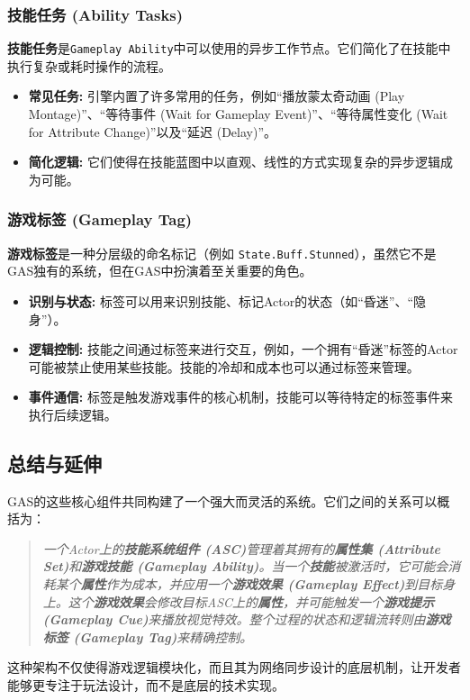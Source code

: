 \documentclass[10pt,CJKmath]{zhbook-v1}
\begin{document}
\subsubsection{技能任务 (Ability Tasks)}
\textbf{技能任务}是\texttt{Gameplay Ability}中可以使用的异步工作节点。它们简化了在技能中执行复杂或耗时操作的流程。
\begin{itemize}
    \item \textbf{常见任务:} 引擎内置了许多常用的任务，例如“播放蒙太奇动画 (Play Montage)”、“等待事件 (Wait for Gameplay Event)”、“等待属性变化 (Wait for Attribute Change)”以及“延迟 (Delay)”。
    \item \textbf{简化逻辑:} 它们使得在技能蓝图中以直观、线性的方式实现复杂的异步逻辑成为可能。
\end{itemize}

\subsubsection{游戏标签 (Gameplay Tag)}
\textbf{游戏标签}是一种分层级的命名标记（例如 \texttt{State.Buff.Stunned}），虽然它不是GAS独有的系统，但在GAS中扮演着至关重要的角色。
\begin{itemize}
    \item \textbf{识别与状态:} 标签可以用来识别技能、标记Actor的状态（如“昏迷”、“隐身”）。
    \item \textbf{逻辑控制:} 技能之间通过标签来进行交互，例如，一个拥有“昏迷”标签的Actor可能被禁止使用某些技能。技能的冷却和成本也可以通过标签来管理。
    \item \textbf{事件通信:} 标签是触发游戏事件的核心机制，技能可以等待特定的标签事件来执行后续逻辑。
\end{itemize}

\subsection{总结与延伸}
GAS的这些核心组件共同构建了一个强大而灵活的系统。它们之间的关系可以概括为：
\begin{quote}
		\itshape
    一个Actor上的\textbf{技能系统组件 (ASC)}管理着其拥有的\textbf{属性集 (Attribute Set)}和\textbf{游戏技能 (Gameplay Ability)}。当一个\textbf{技能}被激活时，它可能会消耗某个\textbf{属性}作为成本，并应用一个\textbf{游戏效果 (Gameplay Effect)}到目标身上。这个\textbf{游戏效果}会修改目标ASC上的\textbf{属性}，并可能触发一个\textbf{游戏提示 (Gameplay Cue)}来播放视觉特效。整个过程的状态和逻辑流转则由\textbf{游戏标签 (Gameplay Tag)}来精确控制。
\end{quote}
这种架构不仅使得游戏逻辑模块化，而且其为网络同步设计的底层机制，让开发者能够更专注于玩法设计，而不是底层的技术实现。
\end{document}
